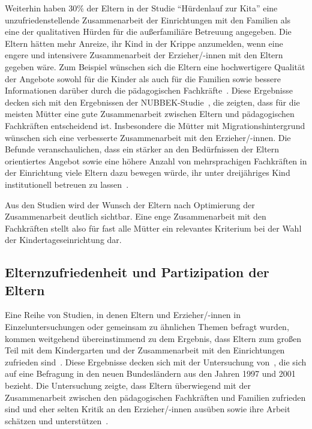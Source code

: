 \documentclass[12pt,a4paper]{article}
\begin{document}
Weiterhin haben 30\% der Eltern in der Studie "`Hürdenlauf zur Kita"' eine unzufriedenstellende Zusammenarbeit der Einrichtungen mit den Familien als eine der qualitativen Hürden für die außerfamiliäre Betreuung angegeben. Die Eltern hätten mehr Anreize, ihr Kind in der Krippe anzumelden, wenn eine engere und intensivere Zusammenarbeit der Erzieher/-innen mit den Eltern gegeben wäre. Zum Beispiel wünschen sich die Eltern eine hochwertigere Qualität der Angebote sowohl für die Kinder als auch für die Familien sowie bessere Informationen darüber durch die pädagogischen Fachkräfte~\parencite[S.~16]{SVR}. Diese Ergebnisse decken sich mit den Ergebnissen der NUBBEK-Studie~\parencite{NUBBEK}, die zeigten, dass für die meisten Mütter eine gute Zusammenarbeit zwischen Eltern und pädagogischen Fachkräften entscheidend ist. Insbesondere die Mütter mit Migrationshintergrund wünschen sich eine verbesserte Zusammenarbeit mit den Erzieher/-innen. Die Befunde veranschaulichen, dass ein stärker an den Bedürfnissen der Eltern orientiertes Angebot sowie eine höhere Anzahl von mehrsprachigen Fachkräften in der Einrichtung viele Eltern dazu bewegen würde, ihr unter dreijähriges Kind institutionell betreuen zu lassen~\parencite[S.~61-67]{Bensel_2013}.

Aus den Studien wird der Wunsch der Eltern nach Optimierung der Zusammenarbeit deutlich sichtbar. Eine enge Zusammenarbeit mit den Fachkräften stellt also für fast alle Mütter ein relevantes Kriterium bei der Wahl der Kindertageseinrichtung dar.


\subsection{Elternzufriedenheit und Partizipation der Eltern}
\label{fragestellungen}
Eine Reihe von Studien, in denen Eltern und Erzieher/-innen in Einzeluntersuchungen oder gemeinsam zu ähnlichen Themen befragt wurden, kommen weitgehend übereinstimmend zu dem Ergebnis, dass Eltern zum großen Teil mit dem Kindergarten und der Zusammenarbeit mit den Einrichtungen zufrieden sind~\parencite{Dippelhofer_1995, Textor_1992}. Diese Ergebnisse decken sich mit der Untersuchung von~\textcite{Wolf_2002}, die sich auf eine Befragung in den neuen Bundesländern aus den Jahren 1997 und 2001 bezieht. Die Untersuchung zeigte, dass Eltern überwiegend mit der Zusammenarbeit zwischen den pädagogischen Fachkräften und Familien zufrieden sind und eher selten Kritik an den Erzieher/-innen ausüben sowie ihre Arbeit schätzen und unterstützen~\parencite[S.~32-34]{Wolf_2002}.
\end{document}
